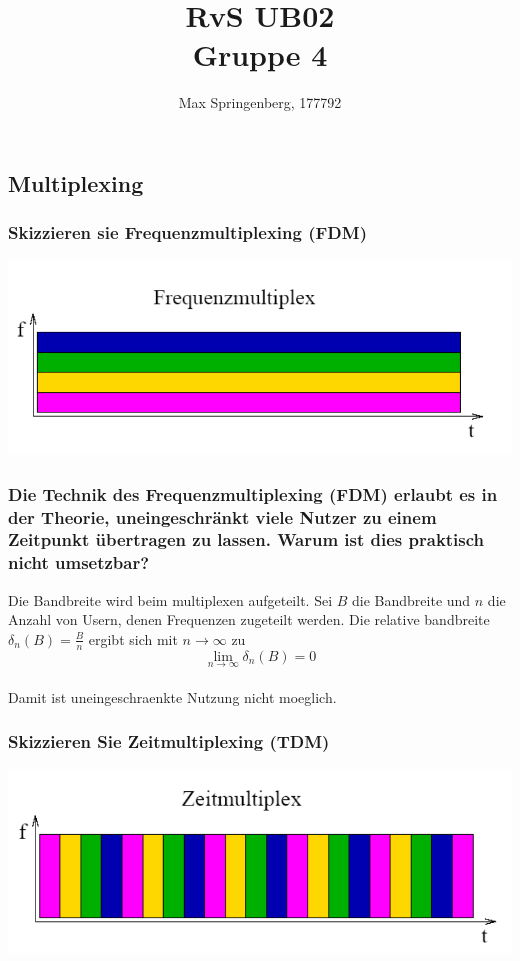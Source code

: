 \documentclass{article}
\author{Max Springenberg, 177792}
\title{
    RvS UB02\\
    Gruppe 4
}
\date{}
\begin{document}
\maketitle
\newpage

\subsection{Multiplexing}

\subsubsection{Skizzieren sie Frequenzmultiplexing (FDM)}
\includegraphics[width=1\textwidth]{FreqMult.png}

\subsubsection{
    Die Technik des Frequenzmultiplexing (FDM) erlaubt es in der 
    Theorie, uneingeschränkt viele Nutzer zu einem Zeitpunkt 
    übertragen zu lassen. Warum ist dies praktisch nicht umsetzbar?
}
Die Bandbreite wird beim multiplexen aufgeteilt. 
Sei $B$ die Bandbreite und $n$ die Anzahl von Usern, denen Frequenzen
zugeteilt werden. Die relative bandbreite $\delta_n(B) = \frac{B}{n}$
ergibt sich mit $n \to \infty$ zu
$$
\lim_{n \to \infty} \delta_n(B) = 0
$$\\
Damit ist uneingeschraenkte Nutzung nicht moeglich.\\

\subsubsection{Skizzieren Sie Zeitmultiplexing (TDM)}
\includegraphics[width=1\textwidth]{TimeMult.png}
\end{document}
